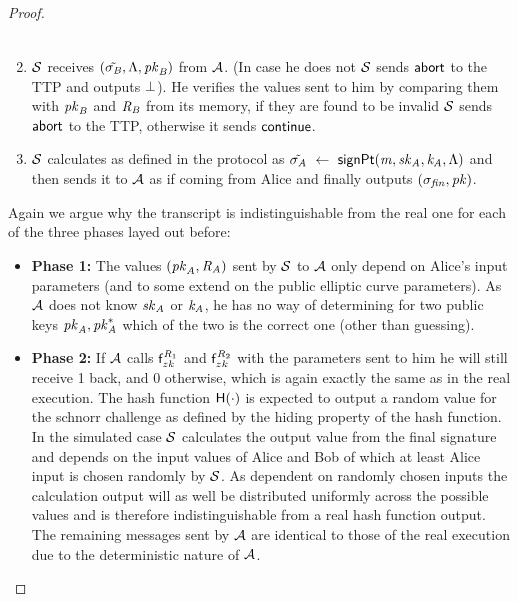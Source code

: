 \begin{proof}
\begin{enumerate}
\begin{gather*}
        \end{gather*}
        \item $\mathcal{S}$ receives $(\tilde{\sigma_{\mathit{B}}}, \Lambda, \mathit{pk}_{\mathit{B}})$ from $\mathcal{A}$.
        (In case he does not $\mathcal{S}$ sends $\mathsf{abort}$ to the TTP and outputs $\bot$).
        He verifies the values sent to him by comparing them with $\mathit{pk}_{\mathit{B}}$ and $\mathit{R}_{\mathit{B}}$ from its memory, if they are found to be invalid $\mathcal{S}$ sends $\mathsf{abort}$ to the TTP, otherwise it sends $\mathsf{continue}$.
        \item $\mathcal{S}$ calculates as defined in the protocol as $\tilde{\sigma_{\mathit{A}}} ~\leftarrow~ \mathsf{signPt}(\mathit{m}, \mathit{sk}_{\mathit{A}}, \mathit{\mathit{k}_{\mathit{A}}}, \Lambda)$ and then sends it to $\mathcal{A}$ as if coming from Alice and finally outputs $(\sigma_{\mathit{fin}}, \mathit{pk})$.
    \end{enumerate}
    Again we argue why the transcript is indistinguishable from the real one for each of the three phases layed out before:
    \begin{itemize}
        \item \textbf{Phase 1: } The values $(\mathit{pk}_{\mathit{A}}, \mathit{R}_{\mathit{A}})$ sent by $\mathcal{S}$ to $\mathcal{A}$ only depend on Alice's input parameters (and to some extend on the public elliptic curve parameters).
        As $\mathcal{A}$ does not know $\mathit{sk}_{\mathit{A}}$ or $\mathit{\mathit{k}_{\mathit{A}}}$, he has no way of determining for two public keys $\mathit{pk}_{\mathit{A}}, \mathit{pk}_{\mathit{A}}^*$ which of the two is the correct one (other than guessing).
        \item \textbf{Phase 2: } If $\mathcal{A}$ calls $\mathsf{f}^{\mathit{R}_1}_{zk}$ and $\mathsf{f}^{\mathit{R}_2}_{zk}$ with the parameters sent to him he will still receive 1 back, and 0 otherwise, which is again exactly the same as in the real execution.
        The hash function $\mathsf{H} (\cdot)$ is expected to output a random value for the schnorr challenge as defined by the hiding property of the hash function.
        In the simulated case $\mathcal{S}$ calculates the output value from the final signature and depends on the input values of Alice and Bob of which at least Alice input is chosen randomly by $\mathcal{S}$.
        As dependent on randomly chosen inputs the calculation output will as well be distributed uniformly across the possible values and is therefore indistinguishable from a real hash function output.
        The remaining messages sent by $\mathcal{A}$ are identical to those of the real execution due to the deterministic nature of $\mathcal{A}$.

\end{itemize}
\end{proof}
